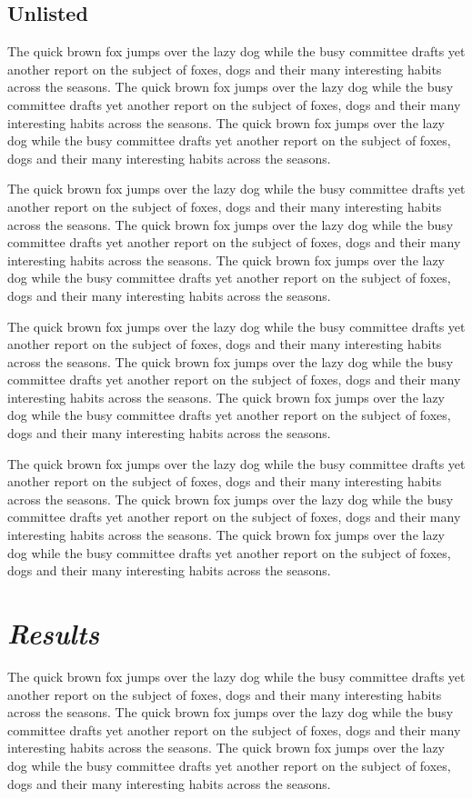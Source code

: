 \documentclass{article}
\begin{document}
\subsection*{Unlisted}
The quick brown fox jumps over the lazy dog while the busy committee drafts yet another report on the subject of foxes, dogs and their many interesting habits across the seasons. The quick brown fox jumps over the lazy dog while the busy committee drafts yet another report on the subject of foxes, dogs and their many interesting habits across the seasons. The quick brown fox jumps over the lazy dog while the busy committee drafts yet another report on the subject of foxes, dogs and their many interesting habits across the seasons. 

The quick brown fox jumps over the lazy dog while the busy committee drafts yet another report on the subject of foxes, dogs and their many interesting habits across the seasons. The quick brown fox jumps over the lazy dog while the busy committee drafts yet another report on the subject of foxes, dogs and their many interesting habits across the seasons. The quick brown fox jumps over the lazy dog while the busy committee drafts yet another report on the subject of foxes, dogs and their many interesting habits across the seasons. 

The quick brown fox jumps over the lazy dog while the busy committee drafts yet another report on the subject of foxes, dogs and their many interesting habits across the seasons. The quick brown fox jumps over the lazy dog while the busy committee drafts yet another report on the subject of foxes, dogs and their many interesting habits across the seasons. The quick brown fox jumps over the lazy dog while the busy committee drafts yet another report on the subject of foxes, dogs and their many interesting habits across the seasons. 

The quick brown fox jumps over the lazy dog while the busy committee drafts yet another report on the subject of foxes, dogs and their many interesting habits across the seasons. The quick brown fox jumps over the lazy dog while the busy committee drafts yet another report on the subject of foxes, dogs and their many interesting habits across the seasons. The quick brown fox jumps over the lazy dog while the busy committee drafts yet another report on the subject of foxes, dogs and their many interesting habits across the seasons. 

\section{\emph{Results}}\label{sec4}
The quick brown fox jumps over the lazy dog while the busy committee drafts yet another report on the subject of foxes, dogs and their many interesting habits across the seasons. The quick brown fox jumps over the lazy dog while the busy committee drafts yet another report on the subject of foxes, dogs and their many interesting habits across the seasons. The quick brown fox jumps over the lazy dog while the busy committee drafts yet another report on the subject of foxes, dogs and their many interesting habits across the seasons. 
\end{document}
